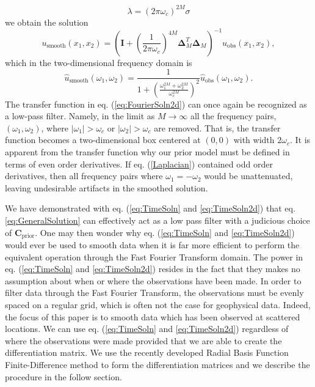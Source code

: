 \documentclass[10pt,a4paper]{article}
\begin{document}
\begin{equation}
\lambda = (2\pi\omega_c)^{2M}\sigma
\end{equation}
we obtain the solution
\begin{equation}\label{eq:TimeSoln2d}
u_\mathrm{smooth}(x_1,x_2) = \left(\mathbf{I} + 
                          \left(\frac{1}{2\pi\omega_c}\right)^{4M}
                          \mathbf{\Delta}_M^T\mathbf{\Delta}_M\right)^{-1}
                          u_\mathrm{obs}(x_1,x_2),
\end{equation}
which in the two-dimensional frequency domain is
\begin{equation}\label{eq:FourierSoln2d}
\hat{u}_\mathrm{smooth}(\omega_1,\omega_2) = \frac{1}{1 + \left(\frac{\omega_1^{2M} + \omega_2^{2M}}
                                                  {\omega_c^{2M}}\right)^2}
                                             \hat{u}_\mathrm{obs}(\omega_1,\omega_2).
\end{equation}
The transfer function in eq. (\ref{eq:FourierSoln2d}) can once again be recognized as a low-pass filter.  Namely, in the limit as $M \to \infty$ all the frequency pairs, $(\omega_1,\omega_2)$, where $|\omega_1| > \omega_c$ or $|\omega_2| > \omega_c$ are removed.  That is, the transfer function becomes a two-dimensional box centered at $(0,0)$ with width $2\omega_c$.  It is apparent from the transfer function why our prior model must be defined in terms of even order derivatives.  If eq. (\ref{Laplacian}) contained odd order derivatives, then all frequency pairs where $\omega_1=-\omega_2$ would be unattenuated, leaving undesirable artifacts in the smoothed solution.

We have demonstrated with eq. (\ref{eq:TimeSoln} and \ref{eq:TimeSoln2d}) that eq. \ref{eq:GeneralSolution} can effectively act as a low pass filter with a judicious choice of $\mathbf{C}_\mathrm{prior}$.  One may then wonder why eq. (\ref{eq:TimeSoln} and \ref{eq:TimeSoln2d}) would ever be used to smooth data when it is far more efficient to perform the equivalent operation through the Fast Fourier Transform domain.  The power in eq. (\ref{eq:TimeSoln} and \ref{eq:TimeSoln2d}) resides in the fact that they makes no assumption about when or where the observations have been made.  In order to filter data through the Fast Fourier Transform, the observations must be evenly spaced on a regular grid, which is often not the case for geophysical data.  Indeed,  the focus of this paper is to smooth data which has been observed at scattered locations.  We can use eq. (\ref{eq:TimeSoln} and \ref{eq:TimeSoln2d}) regardless of where the observations were made provided that we are able to create the differentiation matrix.  We use the recently developed Radial Basis Function Finite-Difference method to form the differentiation matrices and we describe the procedure in the follow section. 


  

 
\end{document}
